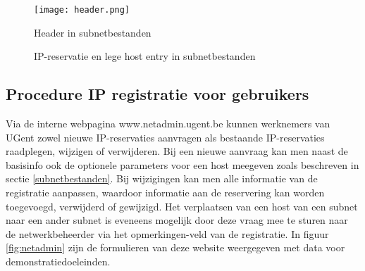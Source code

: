 \begin{figure}[H]
    \texttt{[image: header.png]}
    \caption{Header in subnetbestanden}
    \label{fig:header}
\end{figure}

\begin{figure}[H]
    \hspace*{\fill}
    \caption{IP-reservatie en lege host entry in subnetbestanden}
    \label{fig:host}
\end{figure}

\subsection{Procedure IP registratie voor gebruikers}
Via de interne webpagina www.netadmin.ugent.be kunnen werknemers van UGent zowel nieuwe IP-reservaties aanvragen als bestaande IP-reservaties raadplegen, wijzigen of verwijderen. Bij een nieuwe aanvraag kan men naast de basisinfo ook de optionele parameters voor een host meegeven zoals beschreven in sectie \ref{subnetbestanden}. Bij wijzigingen kan men alle informatie van de registratie aanpassen, waardoor informatie aan de reservering kan worden toegevoegd, verwijderd of gewijzigd. Het verplaatsen van een host van een subnet naar een ander subnet is eveneens mogelijk door deze vraag mee te sturen naar de netwerkbeheerder via het opmerkingen-veld van de registratie. In figuur \ref{fig:netadmin} zijn de formulieren van deze website weergegeven met data voor demonstratiedoeleinden.

